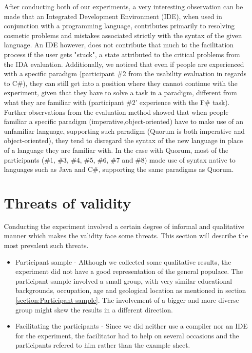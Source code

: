 After conducting both of our experiments, a very interesting observation can be made that an Integrated Development Environment (IDE), when used in conjunction with a programming language, contributes primarily to resolving cosmetic problems and mistakes associated strictly with the syntax of the given language. An IDE however, does not contribute that much to the facilitation process if the user gets "stuck", a state attributed to the critical problems from the IDA evaluation. Additionally, we noticed that even if people are experienced with a specific paradigm (participant \#2 from the usability evaluation in regards to C\#), they can still get into a position where they cannot continue with the experiment, given that they have to solve a task in a paradigm, different from what they are familiar with (participant \#2' experience with the F\# task). Further observations from the evaluation method showed that when people familiar a specific paradigm (imperative,object-oriented) have to make use of an unfamiliar language, supporting such paradigm (Quorum is both imperative and object-oriented), they tend to disregard the syntax of the new language in place of a language they are familiar with. In the case with Quorum, most of the participants (\#1, \#3, \#4, \#5, \#6, \#7 and \#8) made use of syntax native to languages such as Java and C\#, supporting the same paradigms as Quorum.

\section{Threats of validity}
Conducting the experiment involved a certain degree of informal and qualitative manner which makes the validity face some threats. This section will describe the most prevalent such threats.
\begin{itemize}
\item Participant sample - Although we collected some qualitative results, the experiment did not have a good representation of the general populace. The participant sample involved a small group, with very similar educational backgrounds, occupation, age and geological location as mentioned in section \ref{section:Participant sample}. The involvement of a bigger and more diverse group might skew the results in a different direction.
\item Facilitating the participants - Since we did neither use a compiler nor an IDE for the experiment, the facilitator had to help on several occasions and the participants refered to him rather than the example sheet.
\end{itemize}


